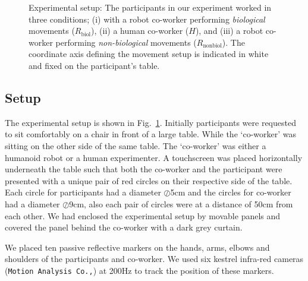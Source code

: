 \begin{figure}[hb]
	\caption{Experimental setup: The participants in our experiment worked in three conditions; (i) with a robot co-worker performing \textit{biological} movements ($\textit{R}_{\text{biol}}$), (ii) a human co-worker ($\textit{H}$), and (iii) a robot co-worker performing \textit{non-biological} movements ($\textit{R}_{\text{nonbiol}}$). The coordinate axis defining the movement setup is indicated in white and fixed on the participant's table.}
	\label{fig:setup}
\end{figure}


\subsection{Setup}

The experimental setup is shown in Fig.~\ref{fig:setup}. Initially participants were requested to sit comfortably on a chair in front of a large table. While the `co-worker' was sitting on the other side of the same table. The `co-worker' was either a humanoid robot or a human experimenter. A touchscreen was placed horizontally underneath the table such that both the co-worker and the participant were presented with a unique pair of red circles on their respective side of the table. Each circle for participants had a diameter $\oslash$5cm and the circles for co-worker had a diameter $\oslash$9cm, also each pair of circles were at a distance of 50cm from each other. We had enclosed the experimental setup by movable panels and covered the panel behind the co-worker with a dark grey curtain. 

We placed ten passive reflective markers on the hands, arms, elbows and shoulders of the participants and co-worker. We used six kestrel infra-red cameras (\texttt{Motion Analysis Co.,}) at 200Hz to track the position of these markers.

